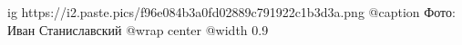  
 
 
 
 

\ifcmt
  ig https://i2.paste.pics/f96e084b3a0fd02889c791922c1b3d3a.png
	@caption Фото: Иван Станиславский
  @wrap center
  @width 0.9
\fi
